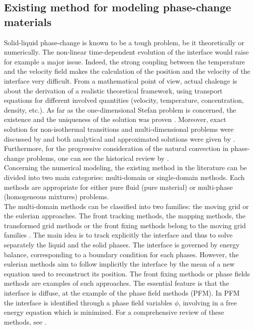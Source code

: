 \subsection{Existing method for modeling phase-change materials}
Solid-liquid phase-change is known to be a tough problem, be it theoretically or numerically.
The non-linear time-dependent evolution of the interface would raise for example a major issue.
Indeed, the strong coupling between the temperature and the velocity field makes the calculation of the position and the velocity of the interface very difficult.
From a mathematical point of view, actual chalenge is about the derivation of a realistic theoretical framework, using transport equations for different involved quantities (velocity, temperature, concentration, density, etc.).
As far as the one-dimensional Stefan problem is concerned, the existence and the uniqueness of the solution was proven \citep{rubinstein1947solution,evans1951note,douglas1957uniqueness}.
Moreover, exact solution for non-isothermal transitions and multi-dimensional problems were discussed by \citep{elliott1987error,cho1969heat} and both analytical and approximated solutions were given by \citep{tarzia2011explicit}. 
Furthermore, for the progressive consideration of the natural convection in phase-change problems, one can see the historical review by \citep{yao1989melting}. \\
Concerning the numerical modeling, the existing method in the literature can be divided into two main categories:
multi-domain or single-domain methods.
Each methods are appropriate for either pure fluid (pure material) or multi-phase (homogeneous mixtures) problems. \\
The multi-domain methods can be classified into two families:
the moving grid or the eulerian approaches. 
The front tracking methods, the mapping methods, the transformed grid methods or the front fixing methods belong to the moving grid families \citep{sparrow1977analysis,gupta2000moving}.
The main idea is to track explicitly the interface and thus to solve separately the liquid and the solid phases.
The interface is governed by energy balance, corresponding to a boundary condition for each phases. 
However, the eulerian methods aim to follow implicitly the interface by the mean of a new equation used to reconstruct its position.
The front fixing methods or phase fields methods are examples of such approaches.
The essential feature is that the interface is diffuse, 
at the example of the phase field methods (PFM). 
In PFM the interface is identified through a phase field variables $\phi$, involving in a free energy equation which is minimized. For a comprehensive review of these methods, see \citep{fix1982phase,davis2001theory,boettinger2002phase,singer2008phase}.\\
